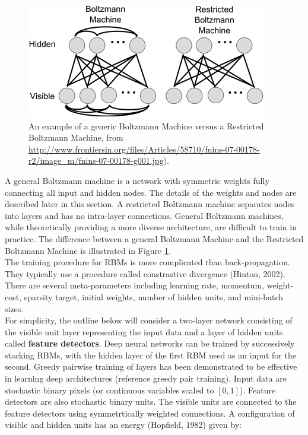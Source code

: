\begin{figure}[tb]
\centering 
\includegraphics[width=0.5\columnwidth]{Figures/BoltzmannMachines.jpg} 
\caption[A Boltzmann Machine diagram]{An example of a generic Boltzmann Machine versus a Restricted Boltzmann Machine, from \url{http://www.frontiersin.org/files/Articles/58710/fnins-07-00178-r2/image_m/fnins-07-00178-g001.jpg}).} %
\label{fig:BoltzmannMachines} 
\end{figure}

A general Boltzmann machine is a network with symmetric weights fully connecting all input and hidden nodes. The details of the weights and nodes are described later in this section. A restricted Boltzmann machine separates nodes into layers and has no intra-layer connections. General Boltzmann machines, while theoretically providing a more diverse architecture, are difficult to train in practice. The difference between a general Boltzmann Machine and the Restricted Boltzmann Machine is illustrated in Figure \ref{fig:BoltzmannMachines}. \\

The training procedure for RBMs is more complicated than back-propagation. They typically use a procedure called constrastive divergence (Hinton, 2002). There are several meta-parameters including learning rate, momentum, weight-cost, sparsity target, initial weights, number of hidden units, and mini-batch sizes. \\

For simplicity, the outline below will consider a two-layer network consisting of the visible unit layer representing the input data and a layer of hidden units called \textbf{feature detectors}. Deep neural networks can be trained by successively stacking RBMs, with the hidden layer of the first RBM used as an input for the second. Greedy pairwise training of layers has been demonstrated to be effective in learning deep architectures (reference greedy pair training). Input data are stochastic binary pixels (or continuous variables scaled to $[0,1]$). Feature detectors are also stochastic binary units. The visible units are connected to the feature detectors using symmetrtically weighted connections. A configuration of visible and hidden units has an energy (Hopfield, 1982) given by:

